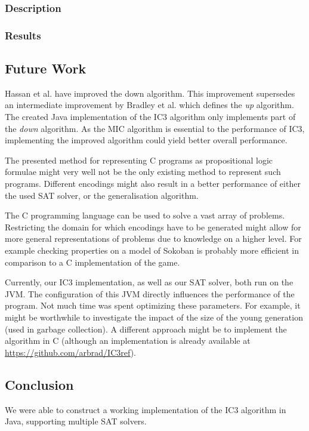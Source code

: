 \documentclass[a4paper]{article}
\begin{document}
\subsubsection{Description}
\subsubsection{Results}

\subsection{Future Work}
Hassan et al. \cite{Hassan2013} have improved the down algorithm. This improvement supersedes an intermediate improvement by Bradley et al. \cite{Bradley2007} which defines the \emph{up} algorithm. The created Java implementation of the IC3 algorithm only implements part of the \emph{down} algorithm. As the MIC algorithm is essential to the performance of IC3, implementing the improved algorithm could yield better overall performance.

The presented method for representing C programs as propositional logic formulae might very well not be the only existing method to represent such programs. Different encodings might also result in a better performance of either the used SAT solver, or the generalisation algorithm.

The C programming language can be used to solve a vast array of problems. Restricting the domain for which encodings have to be generated might allow for more general representations of problems due to knowledge on a higher level. For example checking properties on a model of Sokoban is probably more efficient in comparison to a C implementation of the game.

Currently, our IC3 implementation, as well as our SAT solver, both run on the JVM. The configuration of this JVM directly influences the performance of the program. Not much time was spent optimizing these parameters. For example, it might be worthwhile to investigate the impact of the size of the young generation (used in garbage collection). A different approach might be to implement the algorithm in C (although an implementation is already available at \url{https://github.com/arbrad/IC3ref}).


\subsection{Conclusion}
We were able to construct a working implementation of the IC3 algorithm in Java, supporting multiple SAT solvers.



\end{document}
